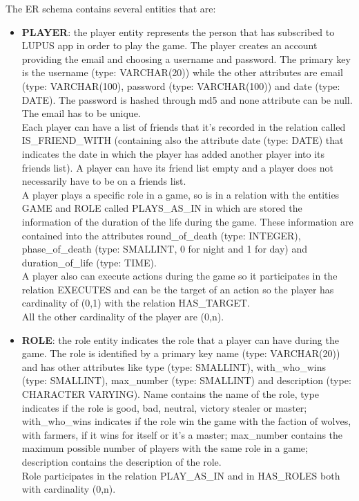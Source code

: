 The ER schema contains several entities that are:
\begin{itemize}
    \item \textbf{PLAYER}: the player entity represents the person that has subscribed to LUPUS app in order to play the game. The player creates an account providing the email and choosing a username and password. The primary key is the username (type: VARCHAR(20)) while the other attributes are email (type: VARCHAR(100), password (type: VARCHAR(100)) and date (type: DATE). The password is hashed through md5 and none attribute can be null. The email has to be unique.\\
    Each player can have a list of friends that it’s recorded in the relation called IS\_FRIEND\_WITH (containing also the attribute date (type: DATE) that indicates the date in which the player has added another player into its friends list). A player can have its friend list empty and a player does not necessarily have to be on a friends list. \\
    A player plays a specific role in a game, so is in a relation with the entities GAME and ROLE called PLAYS\_AS\_IN in which are stored the information of the duration of the life during the game. These information are contained into the attributes round\_of\_death (type: INTEGER), phase\_of\_death (type: SMALLINT, 0 for night and 1 for day) and duration\_of\_life (type: TIME).\\
    A player also can execute actions during the game so it participates in the relation EXECUTES and can be the target of an action so the player has cardinality of (0,1) with the relation HAS\_TARGET. \\
    All the other cardinality of the player are (0,n).
    \item \textbf{ROLE}: the role entity indicates the role that a player can have during the game. The role is identified by a primary key name (type: VARCHAR(20)) and has other attributes like type (type: SMALLINT), with\_who\_wins (type: SMALLINT), max\_number (type: SMALLINT) and description (type: CHARACTER VARYING). Name contains the name of the role, type indicates if the role is good, bad, neutral, victory stealer or master; with\_who\_wins indicates if the role win the game with the faction of wolves, with farmers, if it wins for itself or it's a master; max\_number contains the maximum possible number of players with the same role in a game; description contains the description of the role.\\
    Role participates in the relation PLAY\_AS\_IN and in HAS\_ROLES both with cardinality (0,n).\\

\end{itemize}
